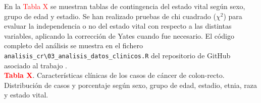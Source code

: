 En la \textcolor{red}{Tabla X} se muestran tablas de contingencia del estado vital según sexo, grupo de edad y estadio. Se han realizado pruebas de chi cuadrado ($\chi^2$) \cite{Pearson1900} para evaluar la independencia o no del estado vital con respecto a las distintas variables, aplicando la corrección de Yates \cite{Yates1934} cuando fue necesario. El código completo del análisis se muestra en el fichero \texttt{analisis\_cr\textbackslash03\_analisis\_datos\_clinicos.R} del repositorio de GitHub asociado al trabajo \cite{Redondo-Sanchez2020}.\\

\textbf{\textcolor{red}{Tabla X}}. Características clínicas de los casos de cáncer de colon-recto. Distribución de casos y porcentaje según sexo, grupo de edad, estadio, etnia, raza y estado vital.


